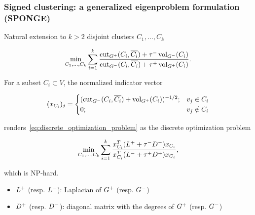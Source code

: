 \documentclass[dvipsnames,mathserif]{beamer}
\newcommand\mypv{\vfill \ifthenelse{\boolean{withPause}}{ \pause }{}}
\begin{document}
\begin{frame}
\fontsize{11pt}\selectfont
\frametitle{\large Signed clustering: a generalized eigenproblem formulation (SPONGE)}
 
Natural extension to  %
$k > 2$ disjoint clusters $C_1,\hdots,C_k$ 

\vspace{-1mm}
\begin{equation}
\label{eq:discrete_optimization_problem}
\min_{C_1,\hdots,C_k} \sum_{i=1}^k \frac{\operatorname{cut}_{G^{+}}(C_i,\overline{C_i}) + \tau^{-}  \operatorname{vol}_{G^{-}}(C_i)}{\operatorname{cut}_{G^{-}}(C_i,\overline{C_i}) + \tau^{+} \operatorname{vol}_{G^{+}}(C_i)}.
\end{equation}
\vspace{-2mm}

For a subset $C_i\subset V$, the normalized indicator vector %

\vspace{-2mm}
\begin{equation}
(x_{C_i})_j = 
 \begin{cases} 
(\operatorname{cut}_{G^{-}}(C_i,\overline{C_i}) + \operatorname{vol}_{G^{+}}(C_i))^{-1/2} ; & v_j \in C_i \\
0 ; &  v_j \notin C_i
\end{cases}
\end{equation}
\vspace{-2mm}

renders~\eqref{eq:discrete_optimization_problem} %
as the  discrete optimization problem

\textcolor{red}{
\vspace{-2mm}
\begin{equation}
\label{eq:discrete_optimization_problem-2}
\min_{C_1,\hdots,C_k} \sum_{i=1}^k \frac{ x_{C_i}^T (L^{+} +  \tau^{-} D^{-}) x_{C_i} }{ x_{C_i}^T (L^{-} +  \tau^{+} D^{+}) x_{C_i} }, 
\end{equation}
} 
\vspace{-2mm}

which is NP-hard. 

\begin{itemize}
\item $L^{+}$ (resp. $L^{-}$): Laplacian of $G^{+}$ (resp. $G^{-}$)
\item $D^{+}$ (resp. $D^{-}$): diagonal matrix with the degrees of $G^{+}$ (resp. $G^{-}$)
\end{itemize}

\end{frame}%
\end{document}
